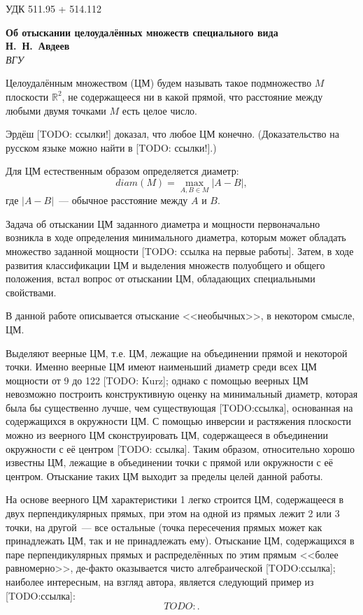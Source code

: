 \documentclass[draft, 12pt]{article}
\begin{document}
\noindent УДК 511.95 + 514.112

\begin{center}
\textbf{Об отыскании целоудалённых множеств специального вида} \\[3mm]
\textbf{Н.~Н.~Авдеев}\\[2mm]
\emph{ВГУ}
\end{center}

Целоудалённым множеством (ЦМ) будем называть такое подмножество $M$ плоскости $\mathbb{R}^2$,
не содержащееся ни в какой прямой,
что расстояние между любыми двумя точками $M$ есть целое число.

Эрдёш [TODO: ссылки!] доказал, что любое ЦМ конечно.
(Доказательство на русском языке можно найти в [TODO: ссылки!].)

Для ЦМ естественным образом определяется диаметр:
$$
	diam(M) = \max_{A,B\in M} |A-B|,
$$
где $|A-B|$~--- обычное расстояние между $A$ и $B$.

Задача об отыскании ЦМ заданного диаметра и мощности первоначально возникла
в ходе определения минимального диаметра,
которым может обладать множество заданной мощности [TODO: ссылка на первые работы].
Затем, в ходе развития классификации ЦМ и выделения множеств полуобщего и общего положения,
встал вопрос от отыскании ЦМ, обладающих специальными свойствами.


В данной работе описывается отыскание <<необычных>>, в некотором смысле, ЦМ.

Выделяют веерные ЦМ, т.е. ЦМ, лежащие на объединении прямой и некоторой точки.
Именно веерные ЦМ имеют наименьший диаметр среди всех ЦМ мощности от 9 до 122 [TODO: Kurz];
однако с помощью веерных ЦМ невозможно построить конструктивную оценку на минимальный диаметр,
которая была бы существенно лучше, чем существующая [TODO:ссылка], основанная на содержащихся в окружности ЦМ.
С помощью инверсии и растяжения плоскости можно из веерного ЦМ сконструировать ЦМ,
содержащееся в объединении окружности с её центром [TODO: ссылка].
Таким образом, относительно хорошо известны ЦМ, лежащие в объединении точки с прямой или окружности с её центром.
Отыскание таких ЦМ выходит за пределы целей данной работы.

На основе веерного ЦМ характеристики 1 легко строится ЦМ, содержащееся в двух перпендикулярных прямых,
при этом на одной из прямых лежит 2 или 3 точки, на другой~--- все остальные
(точка пересечения прямых может как принадлежать ЦМ, так и не принадлежать ему).
Отыскание ЦМ, содержащихся в паре перпендикулярных прямых и распределённых по этим прямым
<<более равномерно>>, де-факто оказывается чисто алгебраической [TODO:ссылка];
наиболее интересным, на взгляд автора, является следующий пример из [TODO:ссылка]:
$$
TODO:
.
$$
\end{document}
